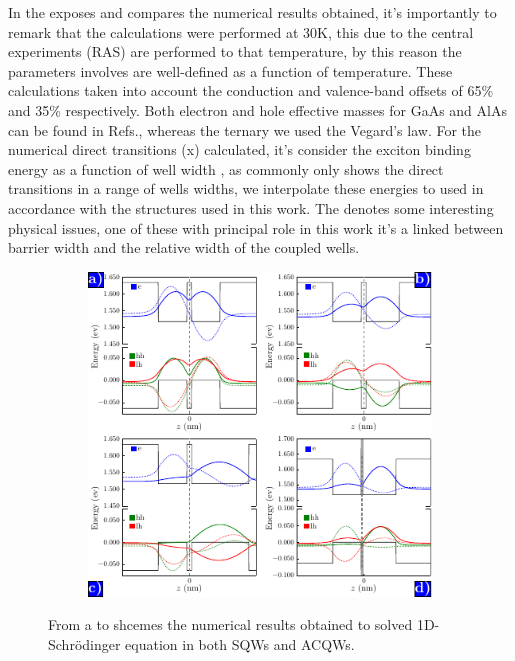 In the  exposes and compares the numerical results obtained, it's importantly to remark that the calculations were performed at 30K, this due to the central experiments (RAS) are performed to that temperature, by this reason the parameters involves are well-defined as a function of temperature. These calculations taken into account the conduction and valence-band offsets of 65\% and 35\% respectively. Both electron and hole effective masses for GaAs and AlAs can be found in Refs.\cite{vurgaftman2001bandparameters,molenk1988determination,adachi2009properties}, whereas the ternary \algaas we used the Vegard's law\cite{donmez2012study}. For the numerical direct transitions (\gls{x}) calculated, it's consider the exciton binding energy as a function of well width \cite{yutaka1994theeffect,greene1984energylevels}, as commonly  only shows the direct transitions in a range of wells widths, we interpolate these energies to  used in accordance with the structures used in  this work. 
The  denotes some interesting physical issues, one of these with principal role in this work it's a linked between barrier width and the relative width of the coupled wells. 
\begin{figure}[H]
	\centering
	\begin{subfigure}{\textwidth}
	\includegraphics[width=\textwidth]{../figures/chapter-2/numerical-calculations/out/numerical-results}
	\label{subfig:chapter-2-sec-numerical-results-a}
	\label{subfig:chapter-2-sec-numerical-results-b}
	\label{subfig:chapter-2-sec-numerical-results-c}
	\label{subfig:chapter-2-sec-numerical-results-d}
	\end{subfigure}
	\caption{From  a to  shcemes the numerical results obtained to solved 1D-Schrödinger equation in both SQWs and ACQWs. }
	\label{fig:chapter-2-sec-numerical-calculations-results}
\end{figure}               
